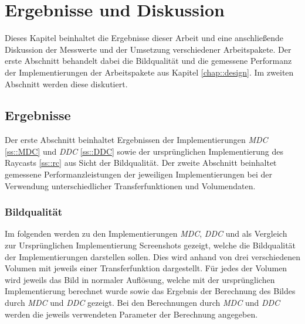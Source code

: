 \chapter{Ergebnisse und Diskussion}\label{chap::resdisc}
Dieses Kapitel beinhaltet die Ergebnisse dieser Arbeit und eine anschließende Diskussion der Messwerte und der Umsetzung verschiedener Arbeitspakete.
Der erste Abschnitt behandelt dabei die Bildqualität und die gemessene Performanz der Implementierungen der Arbeitspakete aus Kapitel \ref{chap::design}.
Im zweiten Abschnitt werden diese diskutiert.

\section{Ergebnisse}\label{sec::results}
Der erste Abschnitt beinhaltet Ergebnissen der Implementierungen \emph{MDC} \ref{ss::MDC} und \emph{DDC} \ref{ss::DDC} sowie der ursprünglichen Implementierung des Raycasts \ref{ss::rc} aus Sicht der Bildqualität.
Der zweite Abschnitt beinhaltet gemessene Performanzleistungen der jeweiligen Implementierungen bei der Verwendung unterschiedlicher Transferfunktionen und Volumendaten.

\subsection{Bildqualität}
Im folgenden werden zu den Implementierungen \emph{MDC}, \emph{DDC} und als Vergleich zur Ursprünglichen Implementierung Screenshots gezeigt, welche die Bildqualität der Implementierungen darstellen sollen.
Dies wird anhand von drei verschiedenen Volumen mit jeweils einer Transferfunktion dargestellt.
Für jedes der Volumen wird jeweils das Bild in normaler Auflösung, welche mit der ursprünglichen Implementierung berechnet wurde sowie das Ergebnis der Berechnung des Bildes durch \emph{MDC} und \emph{DDC} gezeigt.
Bei den Berechnungen durch \emph{MDC} und \emph{DDC} werden die jeweils verwendeten Parameter der Berechnung angegeben.

